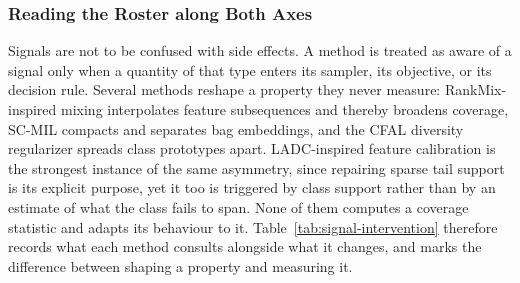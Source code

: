 \documentclass[11pt]{article}
\begin{document}
\subsubsection{Reading the Roster along Both Axes}
Signals are not to be confused with side effects. A method is treated as aware of a signal only when a quantity of that type enters its sampler, its objective, or its decision rule. Several methods reshape a property they never measure: RankMix-inspired mixing interpolates feature subsequences and thereby broadens coverage, SC-MIL compacts and separates bag embeddings, and the CFAL diversity regularizer spreads class prototypes apart. LADC-inspired feature calibration is the strongest instance of the same asymmetry, since repairing sparse tail support is its explicit purpose, yet it too is triggered by class support rather than by an estimate of what the class fails to span. None of them computes a coverage statistic and adapts its behaviour to it. Table~\ref{tab:signal-intervention} therefore records what each method consults alongside what it changes, and marks the difference between shaping a property and measuring it.
\end{document}
